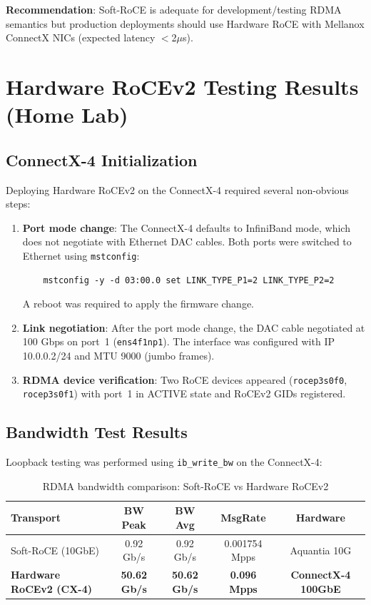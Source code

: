 \documentclass[10pt,letterpaper]{article}
\begin{document}
\textbf{Recommendation}: Soft-RoCE is adequate for development/testing RDMA semantics but production deployments should use Hardware RoCE with Mellanox ConnectX NICs \cite{mofed-docs} (expected latency $<$2$\mu$s).

\section{Hardware RoCEv2 Testing Results (Home Lab)}

\subsection{ConnectX-4 Initialization}

Deploying Hardware RoCEv2 on the ConnectX-4 required several non-obvious steps:

\begin{enumerate}[noitemsep]
    \item \textbf{Port mode change}: The ConnectX-4 defaults to InfiniBand mode, which does not negotiate with Ethernet DAC cables. Both ports were switched to Ethernet using \texttt{mstconfig}:
    \begin{verbatim}
    mstconfig -y -d 03:00.0 set LINK_TYPE_P1=2 LINK_TYPE_P2=2
    \end{verbatim}
    A reboot was required to apply the firmware change.

    \item \textbf{Link negotiation}: After the port mode change, the DAC cable negotiated at 100 Gbps on port~1 (\texttt{ens4f1np1}). The interface was configured with IP 10.0.0.2/24 and MTU 9000 (jumbo frames).

    \item \textbf{RDMA device verification}: Two RoCE devices appeared (\texttt{rocep3s0f0}, \texttt{rocep3s0f1}) with port~1 in ACTIVE state and RoCEv2 GIDs registered.
\end{enumerate}

\subsection{Bandwidth Test Results}

Loopback testing was performed using \texttt{ib\_write\_bw} \cite{perftest} on the ConnectX-4:

\begin{table}[H]
\centering
\small
\begin{tabular}{@{}lcccc@{}}
\toprule
\textbf{Transport} & \textbf{BW Peak} & \textbf{BW Avg} & \textbf{MsgRate} & \textbf{Hardware} \\
\midrule
Soft-RoCE (10GbE) & 0.92 Gb/s & 0.92 Gb/s & 0.001754 Mpps & Aquantia 10G \\
\textbf{Hardware RoCEv2 (CX-4)} & \textbf{50.62 Gb/s} & \textbf{50.62 Gb/s} & \textbf{0.096 Mpps} & \textbf{ConnectX-4 100GbE} \\
\bottomrule
\end{tabular}
\caption{RDMA bandwidth comparison: Soft-RoCE vs Hardware RoCEv2}
\end{table}
\end{document}
